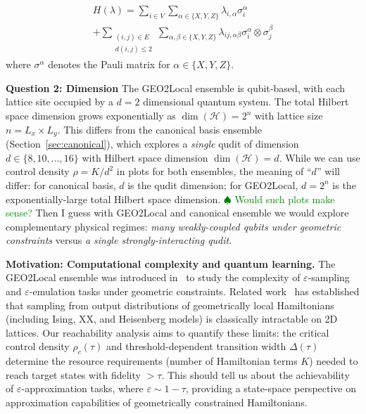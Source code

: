 \documentclass[aps,prx,reprint,superscriptaddress,footnote, twocolumn,notitlepage]{revtex4-2}
\newcommand{\tom}[1]{\textcolor{green}{#1}}
\newcommand{\todotom}[1]{\tom{$\spadesuit$ #1}}
\begin{document}
\begin{equation}
\begin{aligned}
H(\lambda) = \sum_{i \in V} \sum_{\alpha \in \{X,Y,Z\}} \lambda_{i,\alpha} \sigma_i^\alpha \\
           + \sum_{\substack{(i,j) \in E \\ d(i,j) \leq 2}} \sum_{\alpha,\beta \in \{X,Y,Z\}} \lambda_{ij,\alpha\beta} \sigma_i^\alpha \otimes \sigma_j^\beta
\end{aligned}
\label{eq:geo2local_k2}
\end{equation}
where $\sigma^\alpha$ denotes the Pauli matrix for $\alpha \in \{X, Y, Z\}$.


\textbf{Question 2: Dimension} The GEO2Local ensemble is qubit-based, with each lattice site occupied by a $d=2$ dimensional quantum system. The total Hilbert space dimension grows exponentially as $\dim(\mathcal{H}) = 2^{n}$ with lattice size $n = L_x \times L_y$. This differs from the canonical basis ensemble (Section~\ref{sec:canonical}), which explores a \emph{single} qudit of dimension $d \in \{8, 10, \ldots, 16\}$ with Hilbert space dimension $\dim(\mathcal{H}) = d$. While we can use control density $\rho = K/d^2$ in plots for both ensembles, the meaning of ``$d$'' will differ: for canonical basis, $d$ is the qudit dimension; for GEO2Local, $d = 2^n$ is the exponentially-large total Hilbert space dimension. \todotom{Would such plots make sense?} Then I guess with GEO2Local and canonical ensemble we would  explore complementary physical regimes: \emph{many weakly-coupled qubits under geometric constraints} versus \emph{a single strongly-interacting qudit}. 

\textbf{Motivation: Computational complexity and quantum learning.} The GEO2Local ensemble was introduced in~\cite{quek2025quantumadvantagerandomgeometricallytwolocal} to study the complexity of $\varepsilon$-sampling and $\varepsilon$-emulation tasks  under geometric constraints. Related work~\cite{park2023hardnessquantumspindynamics} has established that sampling from output distributions of geometrically local Hamiltonians (including Ising, XX, and Heisenberg models) is classically intractable on 2D lattices. Our reachability analysis aims to quantify these limits: the critical control density $\rho_c(\tau)$ and threshold-dependent transition width $\Delta(\tau)$ determine the resource requirements (number of Hamiltonian terms $K$) needed to reach target states with fidelity $> \tau$. This should tell us about the achievability of $\varepsilon$-approximation tasks, where $\varepsilon \sim 1 - \tau$, providing a state-space perspective on approximation capabilities of geometrically constrained Hamiltonians.
\end{document}
